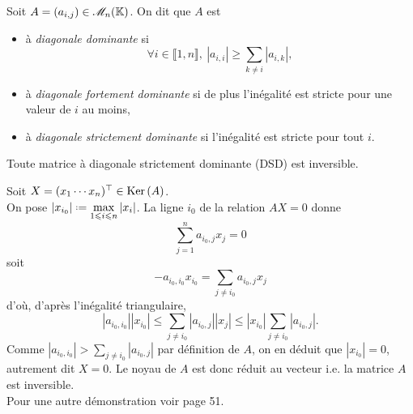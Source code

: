 \begin{defi}
    Soit $A = (a_{i,j}) \in \mathscr{M}_n(\mathbb{K})$. On dit que $A$ est 
    \begin{itemize}
        \item à \emph{diagonale dominante} si
        $$\forall i \in \llbracket 1, n \rrbracket,\ |a_{i,i}| \geqslant \sum_{k \not = i} |a_{i,k}|,$$
        \item à \emph{diagonale fortement dominante} si de plus l'inégalité est stricte pour une valeur de $i$ au moins,
        \item à \emph{diagonale strictement dominante} si l'inégalité est stricte pour tout $i$. 
    \end{itemize}
\end{defi}

\begin{lemme} \label{lemme_hadamard}
    Toute matrice à diagonale strictement dominante (DSD) est inversible.
\end{lemme}


\begin{preuve}
    Soit $X = (x_1 \cdots x_n)^\top \in \mathrm{Ker}\,(A)$. \\
    On pose $\displaystyle \left |x_{i_0} \right| \defeq \max_{1 \leqslant i \leqslant n} |x_i|$. La ligne $i_0$ de la relation $AX = 0$ donne
    $$\sum_{j=1}^n a_{i_0,j}x_j = 0$$
    soit
    $$-a_{i_0, i_0} x_{i_0} = \sum_{j \not = i_0} a_{i_0,j} x_j$$
    d'où, d'après l'inégalité triangulaire,
    $$|a_{i_0, i_0}| |x_{i_0}| \leqslant \sum_{j \not = i_0} |a_{i_0,j}| |x_j| \leqslant |x_{i_0}| \sum_{j \not = i_0} |a_{i_0, j}|.$$
    Comme $|a_{i_0, i_0}| > \sum\limits_{j \not = i_0} |a_{i_0, j}|$ par définition de $A$, on en déduit que
    $|x_{i_0}| = 0$, autrement dit $X = 0$. Le noyau de $A$ est donc réduit au vecteur i.e. la matrice $A$ est inversible. \\
    Pour une autre démonstration voir \cite{matrices} page 51. 
\end{preuve}


